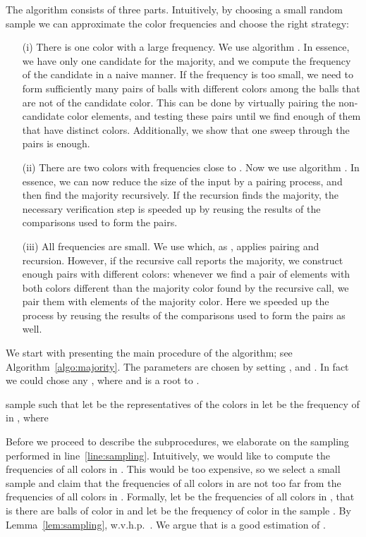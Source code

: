 \documentclass{article}[11pt,a4paper]
\begin{document}
\pagebreak

The algorithm consists of three parts. Intuitively, by choosing a small random sample
we can approximate the color frequencies and choose the right strategy:
\begin{enumerate}
\item[(i)] There is one color with a large
frequency. We use algorithm . In essence, we have only one candidate for the majority, and
we compute the frequency of the candidate in a naive manner. If the frequency is too small, we need to form sufficiently many pairs of balls with different colors among the balls that are not of the candidate color. This can be done by virtually pairing the non-candidate color elements, and testing these pairs until we find enough of them that have distinct colors. Additionally, we show that one sweep through the pairs is enough.
\item[(ii)] There are two colors with frequencies close to . Now we use algorithm . In essence, we can now reduce the size of the input by a pairing process, and then find the majority recursively.
If the recursion finds the majority, the necessary verification step is speeded up by reusing the results of the comparisons used to form the pairs.
\item[(iii)] All frequencies are small. We use  which, as , applies pairing and recursion. However, if the recursive call reports the majority, we construct enough pairs with different colors: whenever we find a pair of elements with both colors different than the majority color found by the recursive call, we pair them with elements of the majority color. Here we speeded up the process by reusing the results of the comparisons used to form the pairs as well.
\end{enumerate}

We start with presenting the main procedure of the algorithm; see Algorithm~\ref{algo:majority}.
The parameters are chosen by setting ,  and . In fact we could chose any , where  and  is a root to .

\begin{algorithm}
\caption{\label{algo:majority}}
sample  such that \;
let  be the representatives of the colors in \;
let  be the frequency of  in , where \label{line:sampling}\;
\If{}{
  \KwRet{}
}\Else{
  \KwRet{}
}
\end{algorithm}

Before we proceed to describe the subprocedures, we elaborate on the sampling performed
in line~\ref{line:sampling}. Intuitively, we would like to compute the frequencies of all colors
in . This would be too expensive, so we select a small sample  and claim that the
frequencies of all colors in  are not too far from the frequencies of all colors in .
Formally, let  be the frequencies of all colors in , that is
there are  balls of color  in  and let  be the
frequency of color  in the sample . By Lemma~\ref{lem:sampling}, w.v.h.p.\ 
. We argue that 
is a good estimation of .
\end{document}

